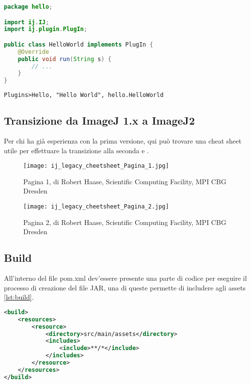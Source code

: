 \begin{lstlisting}[language=Java,caption={Esempio semplice di un plugin Fiji in cui viene utilizzato ImageJ 1.x}, label={lst:ImageJ1}]
package hello;

import ij.IJ;
import ij.plugin.PlugIn;

public class HelloWorld implements PlugIn {
    @Override
    public void run(String s) {
    	// ...
    }
}
\end{lstlisting}

\begin{lstlisting}[caption={Esempio di file plugins.config obbligatorio nel caso dell'uso di ImageJ 1.x}, label={lst:ImageJ1Config}]
	Plugins>Hello, "Hello World", hello.HelloWorld
\end{lstlisting}

\subsection{Transizione da ImageJ 1.x a ImageJ2}
\noindent Per chi ha già esperienza con la prima versione, qui può trovare una cheat sheet utile per effettuare la transizione alla seconda  e .

\begin{figure}[H]
\centering
\texttt{[image: ij\_legacy\_cheetsheet\_Pagina\_1.jpg]}
\caption{Pagina 1, di Robert Haase, Scientific Computing Facility, MPI CBG Dresden}
\label{fig:6}
\end{figure}

\begin{figure}[H]
\centering
\texttt{[image: ij\_legacy\_cheetsheet\_Pagina\_2.jpg]}
\caption{Pagina 2, di Robert Haase, Scientific Computing Facility, MPI CBG Dresden}
\label{fig:7}
\end{figure}


\subsection{Build}
\noindent All'interno del file pom.xml dev'essere presente una parte di codice per eseguire il processo di creazione del file JAR, una di queste permette di includere agli assets \ref{lst:build}.

\begin{lstlisting}[language=XML, caption={"pom.xml, sottosezione build"}, label=lst:build]
<build>
	<resources>
        <resource>
            <directory>src/main/assets</directory>
            <includes>
                <include>**/*</include>
            </includes>
        </resource>
    </resources>
</build>
\end{lstlisting}

